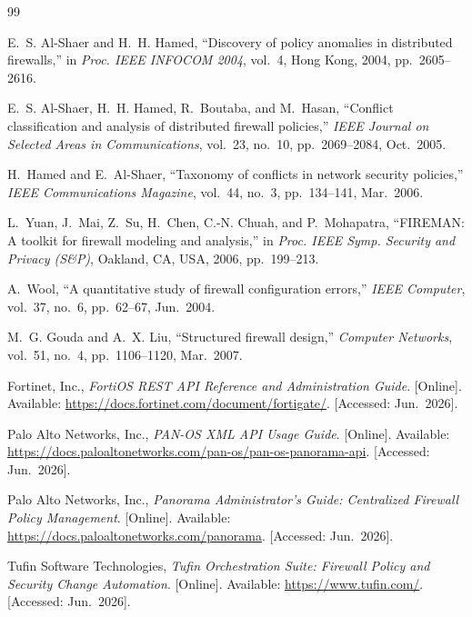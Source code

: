 \documentclass[12pt,a4paper]{report}
\renewcommand{\_}{\textunderscore\allowbreak}
\begin{document}
\cleardoublepage
{}
%
\begin{thebibliography}{99}

E.~S. Al-Shaer and H.~H. Hamed, ``Discovery of policy anomalies in distributed firewalls,'' in \emph{Proc. IEEE INFOCOM 2004}, vol.~4, Hong Kong, 2004, pp.~2605--2616.

E.~S. Al-Shaer, H.~H. Hamed, R.~Boutaba, and M.~Hasan, ``Conflict classification and analysis of distributed firewall policies,'' \emph{IEEE Journal on Selected Areas in Communications}, vol.~23, no.~10, pp.~2069--2084, Oct.~2005.

H.~Hamed and E.~Al-Shaer, ``Taxonomy of conflicts in network security policies,'' \emph{IEEE Communications Magazine}, vol.~44, no.~3, pp.~134--141, Mar.~2006.

L.~Yuan, J.~Mai, Z.~Su, H.~Chen, C.-N. Chuah, and P.~Mohapatra, ``FIREMAN: A toolkit for firewall modeling and analysis,'' in \emph{Proc. IEEE Symp. Security and Privacy (S\&P)}, Oakland, CA, USA, 2006, pp.~199--213.

A.~Wool, ``A quantitative study of firewall configuration errors,'' \emph{IEEE Computer}, vol.~37, no.~6, pp.~62--67, Jun.~2004.

M.~G. Gouda and A.~X. Liu, ``Structured firewall design,'' \emph{Computer Networks}, vol.~51, no.~4, pp.~1106--1120, Mar.~2007.

Fortinet, Inc., \emph{FortiOS REST API Reference and Administration Guide}. [Online]. Available: \url{https://docs.fortinet.com/document/fortigate/}. [Accessed: Jun.~2026].

Palo Alto Networks, Inc., \emph{PAN-OS XML API Usage Guide}. [Online]. Available: \url{https://docs.paloaltonetworks.com/pan-os/pan-os-panorama-api}. [Accessed: Jun.~2026].

Palo Alto Networks, Inc., \emph{Panorama Administrator's Guide: Centralized Firewall Policy Management}. [Online]. Available: \url{https://docs.paloaltonetworks.com/panorama}. [Accessed: Jun.~2026].

Tufin Software Technologies, \emph{Tufin Orchestration Suite: Firewall Policy and Security Change Automation}. [Online]. Available: \url{https://www.tufin.com/}. [Accessed: Jun.~2026].


\end{thebibliography}
\end{document}
